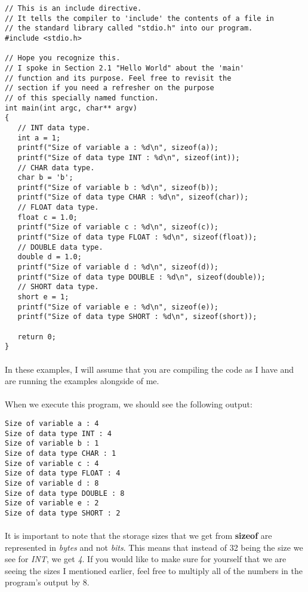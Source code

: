 \newpage

\begin{lstlisting}
// This is an include directive.
// It tells the compiler to 'include' the contents of a file in 
// the standard library called "stdio.h" into our program.
#include <stdio.h>

// Hope you recognize this.
// I spoke in Section 2.1 "Hello World" about the 'main' 
// function and its purpose. Feel free to revisit the 
// section if you need a refresher on the purpose
// of this specially named function.
int main(int argc, char** argv)
{
   // INT data type.
   int a = 1;
   printf("Size of variable a : %d\n", sizeof(a));
   printf("Size of data type INT : %d\n", sizeof(int));
   // CHAR data type.
   char b = 'b';
   printf("Size of variable b : %d\n", sizeof(b));
   printf("Size of data type CHAR : %d\n", sizeof(char));
   // FLOAT data type.
   float c = 1.0;
   printf("Size of variable c : %d\n", sizeof(c));
   printf("Size of data type FLOAT : %d\n", sizeof(float));
   // DOUBLE data type.
   double d = 1.0;
   printf("Size of variable d : %d\n", sizeof(d));
   printf("Size of data type DOUBLE : %d\n", sizeof(double));
   // SHORT data type.
   short e = 1;
   printf("Size of variable e : %d\n", sizeof(e));
   printf("Size of data type SHORT : %d\n", sizeof(short));

   return 0;
}
\end{lstlisting}

\paragraph{}
   In these examples, I will assume that you are compiling the code as I have and are running the examples alongside of me.

\paragraph{}
   When we execute this program, we should see the following output:

\begin{lstlisting}
Size of variable a : 4
Size of data type INT : 4
Size of variable b : 1
Size of data type CHAR : 1
Size of variable c : 4
Size of data type FLOAT : 4
Size of variable d : 8
Size of data type DOUBLE : 8
Size of variable e : 2
Size of data type SHORT : 2
\end{lstlisting}

\paragraph{}
   It is important to note that the storage sizes that we get from \textbf{sizeof} are represented in \textit{bytes} and not \textit{bits}.
   This means that instead of 32 being the size we see for \textit{INT}, we get \textit{4}. If you would like to make sure for yourself that we are
   seeing the sizes I mentioned earlier, feel free to multiply all of the numbers in the program's output by 8.

